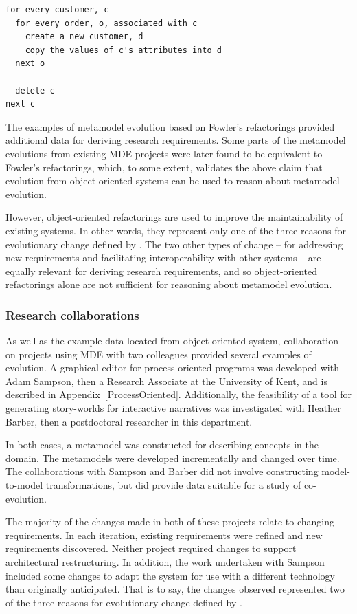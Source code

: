 \begin{lstlisting}[caption=Pseudo code migration strategy for the refactoring in Figure~\ref{fig:refactoring}., label=lst:refactoring]
for every customer, c
  for every order, o, associated with c
    create a new customer, d
    copy the values of c's attributes into d
  next o
	
  delete c
next c
\end{lstlisting}

The examples of metamodel evolution based on Fowler's refactorings provided additional data for deriving research requirements. Some parts of the metamodel evolutions from existing MDE projects were later found to be equivalent to Fowler's refactorings, which, to some extent, validates the above claim that evolution from object-oriented systems can be used to reason about metamodel evolution.

However, object-oriented refactorings are used to improve the maintainability of existing systems. In other words, they represent only one of the three reasons for evolutionary change defined by \cite{sjoberg93quantifying}. The two other types of change -- for addressing new requirements and facilitating interoperability with other systems -- are equally relevant for deriving research requirements, and so object-oriented refactorings alone are not sufficient for reasoning about metamodel evolution.

\subsubsection{Research collaborations}
As well as the example data located from object-oriented system, collaboration on projects using MDE with two colleagues provided several examples of evolution. A graphical editor for process-oriented programs was developed with Adam Sampson, then a Research Associate at the University of Kent, and is described in Appendix~\ref{ProcessOriented}. Additionally, the feasibility of a tool for generating story-worlds for interactive narratives was investigated with Heather Barber, then a postdoctoral researcher in this department.

In both cases, a metamodel was constructed for describing concepts in the domain. The metamodels were developed incrementally and changed over time. The collaborations with Sampson and Barber did not involve constructing model-to-model transformations, but did provide data suitable for a study of co-evolution.

The majority of the changes made in both of these projects relate to changing requirements. In each iteration, existing requirements were refined and new requirements discovered. Neither project required changes to support architectural restructuring. In addition, the work undertaken with Sampson included some changes to adapt the system for use with a different technology than originally anticipated. That is to say, the changes observed represented two of the three reasons for evolutionary change defined by \cite{sjoberg93quantifying}. 


